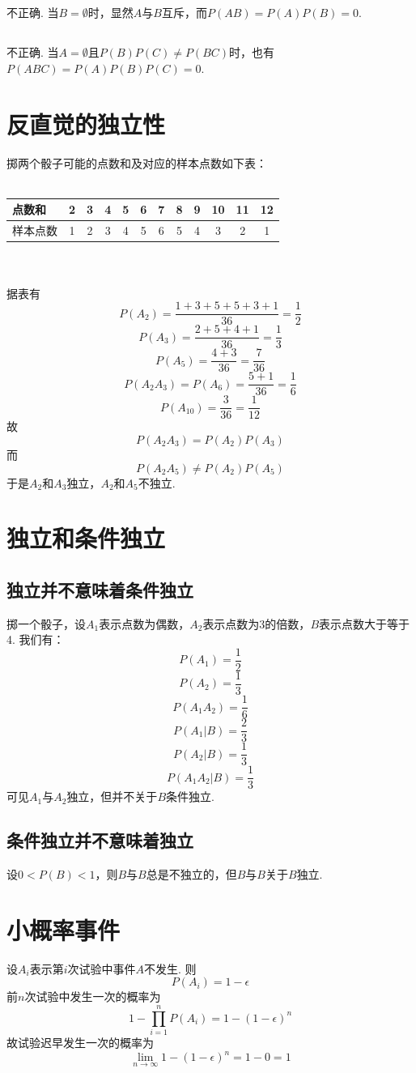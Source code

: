 \documentclass{article}
\begin{document}
\begin{CJK}{UTF8}{gbsn}
\subsection{}
不正确. 当$B=\emptyset$时，显然$A$与$B$互斥，而$P(AB)=P(A)P(B)=0$.
\subsection{}
不正确. 当$A=\emptyset$且$P(B)P(C)\neq P(BC)$时，也有$P(ABC)=P(A)P(B)P(C)=0$.
\section{反直觉的独立性}
掷两个骰子可能的点数和及对应的样本点数如下表：\\\\
\begin{tabular}{l|c|c|c|c|c|c|c|c|c|c|c}
	点数和&2&3&4&5&6&7&8&9&10&11&12\\
	\hline
	样本点数&1&2&3&4&5&6&5&4&3&2&1
\end{tabular}\\\\
据表有
$$ P(A_{2})=\frac{1+3+5+5+3+1}{36}=\frac{1}{2} $$
$$ P(A_{3})=\frac{2+5+4+1}{36}=\frac{1}{3} $$
$$ P(A_{5})=\frac{4+3}{36}=\frac{7}{36} $$
$$ P(A_{2}A_{3})=P(A_{6})=\frac{5+1}{36}=\frac{1}{6} $$
$$ P(A_{10})=\frac{3}{36}=\frac{1}{12} $$
故
$$ P(A_{2}A_{3})=P(A_{2})P(A_{3}) $$
而
$$ P(A_{2}A_{5})\neq P(A_{2})P(A_{5}) $$
于是$A_{2}$和$A_{3}$独立，$A_{2}$和$A_{5}$不独立.
\section{独立和条件独立}
\subsection{独立并不意味着条件独立}
掷一个骰子，设$A_{1}$表示点数为偶数，$A_{2}$表示点数为3的倍数，$B$表示点数大于等于4. 我们有：
$$ P(A_{1})=\frac{1}{2} $$
$$ P(A_{2})=\frac{1}{3} $$
$$ P(A_{1}A_{2})=\frac{1}{6} $$
$$ P(A_{1}|B)=\frac{2}{3} $$
$$ P(A_{2}|B)=\frac{1}{3} $$
$$ P(A_{1}A_{2}|B)=\frac{1}{3} $$
可见$A_{1}$与$A_{2}$独立，但并不关于$B$条件独立.
\subsection{条件独立并不意味着独立}
设$0<P(B)<1$，则$B$与$B$总是不独立的，但$B$与$B$关于$B$独立.
\section{小概率事件}
设$A_{i}$表示第$i$次试验中事件$A$不发生. 则
$$P(A_{i})=1-\epsilon $$
前$n$次试验中发生一次的概率为
$$ 1-\prod\limits_{i=1}^{n} P(A_{i})=1-(1-\epsilon)^{n} $$
故试验迟早发生一次的概率为
$$ \lim_{n\to \infty}1-(1-\epsilon)^{n}=1-0=1 $$

\end{CJK}
\end{document}
